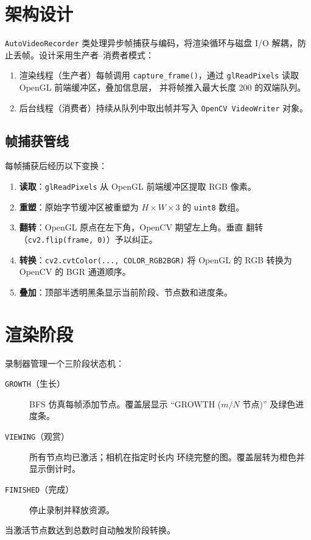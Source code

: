 \documentclass[11pt,a4paper]{report}
\begin{document}
\section{架构设计}
\label{sec:recorder-arch}
\texttt{AutoVideoRecorder} 类处理异步帧捕获与编码，将渲染循环与磁盘
I/O 解耦，防止丢帧。设计采用生产者--消费者模式：
\begin{enumerate}
    \item 渲染线程（生产者）每帧调用 \texttt{capture\_frame()}，通过
          \texttt{glReadPixels} 读取 OpenGL 前端缓冲区，叠加信息层，
          并将帧推入最大长度 200 的双端队列。
    \item 后台线程（消费者）持续从队列中取出帧并写入
          \texttt{OpenCV VideoWriter} 对象。
\end{enumerate}
\subsection{帧捕获管线}
\label{sec:frame-capture}
每帧捕获后经历以下变换：
\begin{enumerate}
    \item \textbf{读取}：\texttt{glReadPixels} 从 OpenGL 前端缓冲区提取
          RGB 像素。
    \item \textbf{重塑}：原始字节缓冲区被重塑为 $H \times W \times 3$
          的 \texttt{uint8} 数组。
    \item \textbf{翻转}：OpenGL 原点在左下角，OpenCV 期望左上角。垂直
          翻转（\texttt{cv2.flip(frame, 0)}）予以纠正。
    \item \textbf{转换}：\texttt{cv2.cvtColor(..., COLOR\_RGB2BGR)} 将
          OpenGL 的 RGB 转换为 OpenCV 的 BGR 通道顺序。
    \item \textbf{叠加}：顶部半透明黑条显示当前阶段、节点数和进度条。
\end{enumerate}
\section{渲染阶段}
\label{sec:phases}
录制器管理一个三阶段状态机：
\begin{description}
    \item[\texttt{GROWTH}（生长）] BFS 仿真每帧添加节点。覆盖层显示
          ``GROWTH ($m/N$ 节点)'' 及绿色进度条。
    \item[\texttt{VIEWING}（观赏）] 所有节点均已激活；相机在指定时长内
          环绕完整的图。覆盖层转为橙色并显示倒计时。
    \item[\texttt{FINISHED}（完成）] 停止录制并释放资源。
\end{description}
当激活节点数达到总数时自动触发阶段转换。
\end{document}
